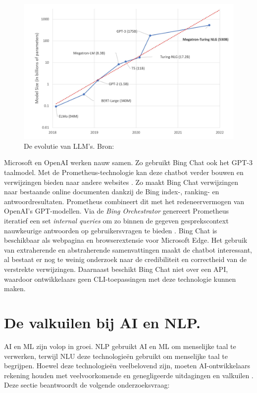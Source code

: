 \begin{figure}[H]
	\begin{center}
		\includegraphics[width=\linewidth]{img/graph-language-models.png}
		\caption{De evolutie van LLM's. Bron: \autocite{Simon2021}}
		\label{img:graph-language-models}
	\end{center}
\end{figure}

Microsoft en OpenAI werken nauw samen. Zo gebruikt Bing Chat ook het GPT-3 taalmodel. Met de Prometheus-technologie kan deze chatbot verder bouwen en verwijzingen bieden naar andere websites \autocite{Ribas2023}. Zo maakt Bing Chat verwijzingen naar bestaande online documenten dankzij de Bing index-, ranking- en antwoordresultaten. Prometheus combineert dit met het redeneervermogen van OpenAI’s GPT-modellen. Via de \textit{Bing Orchestrator} genereert Prometheus iteratief een set \textit{internal queries} om zo binnen de gegeven gesprekscontext nauwkeurige antwoorden op gebruikersvragen te bieden \autocite{Ribas2023}. Bing Chat is beschikbaar als webpagina en browserextensie voor Microsoft Edge. Het gebruik van extraherende en abstraherende samenvattingen maakt de chatbot interessant, al bestaat er nog te weinig onderzoek naar de credibiliteit en correctheid van de verstrekte verwijzingen. Daarnaast beschikt Bing Chat niet over een API, waardoor ontwikkelaars geen CLI-toepassingen met deze technologie kunnen maken.

\section{De valkuilen bij AI en NLP.}

AI en ML zijn volop in groei. NLP gebruikt AI en ML om menselijke taal te verwerken, terwijl NLU deze technologieën gebruikt om menselijke taal te begrijpen. Hoewel deze technologieën veelbelovend zijn, moeten AI-ontwikkelaars rekening houden met veelvoorkomende en genegligeerde uitdagingen en valkuilen \autocite{Sciforce2020, Roldos2020, Khurana2022}. Deze sectie beantwoordt de volgende onderzoeksvraag: 

